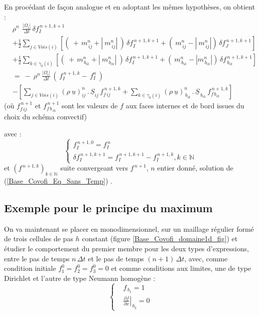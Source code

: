 En proc\'edant de fa\c con analogue et en adoptant les m\^emes hypoth\`eses, on
obtient :
\begin{equation}
\begin{array}{lll}
&\rho^n\,\displaystyle\ \frac{|\Omega_i|}{\Delta
t}\,\delta f_I^{\,n+1,k+1}\\
& +\displaystyle\frac{1}{2}\sum\limits_{j\in Vois(i)}\left[(\
+\,m_{\,ij}^n + |\ m_{\,ij}^n|\ )\,\delta f_I^{\,n+1,k+1}+ (\ m_{\,ij}^n - |\
m_{\,ij}^n|)\,\delta f_J^{\,n+1,k+1}\right]\\
&+\displaystyle\frac{1}{2}\sum\limits_{k\in {\gamma_b(i)}}\left[(\ +\,
m_{\,{b}_{ik}}^n + |\ m_{\,{b}_{ik}}^n|\ )\,\delta f_I^{\,n+1,k+1} + (\
m_{\,{b}_{ik}}^n - |m_{\,{b}_{ik}}^n|)\,\delta
f_{\,{b}_{ik}}^{\,n+1,k+1}\right]\\
& =\ -\ \displaystyle \rho^n \,\frac {|\Omega_i| }{\Delta t}\,(\,f_I^{\,n+1,k}
-\,f_I^n\,)\\
& - \left[\sum\limits_{j\in Vois(i)} (\rho\
\underline{u})^{n}_{ij}\,.\,\underline{S}_{ij}\,
f^{\,n+1,k}_{f\,ij}+\sum\limits_{k\in {\gamma_b(i)}} (\rho\
\underline{u})^{n}_{\,b_{ik}}\,.\,\underline{S}_{\,b_{ik}}\,f^{\,n+1,k}_{f\,{b_{ik}}}\right]
\end{array}
\end{equation}
(o\`{u} $f^{\,n+1}_{f\,ij}$ et $f^{\,n+1}_{f\,{b_{\,ik}}}$ sont les valeurs de $f$
aux faces internes et de bord issues du choix du sch\'{e}ma convectif)

avec :
\begin{equation}
\left\{\begin{array}{ll}
f_I^{\,n+1,0} = f_I^{\,n}\\
\delta f_I^{\,n+1,k+1} = f_I^{\,n+1,k+1} - f_I^{\,n+1,k},{\text {$k\in \mathbb{N}$}}
\end{array}\right.
\end{equation}
et $(f^{\,n+1,k})_{k\in \mathbb{N}}$ suite convergeant vers  $f^{\,n+1}$, $n$
entier donn\'e, solution de (\ref{Base_Covofi_Eq_Sans_Temp}) .\\

\subsection*{Exemple pour le principe du maximum}

On va maintenant se placer en monodimensionnel, sur un maillage r\'egulier
form\'e de trois cellules de pas $h$ constant (figure \ref{Base_Covofi_domaine1d_fig}) et \'etudier le comportement
du premier membre pour les deux types d'expressions, entre le pas de temps
 $n\,\Delta t$ et le pas de temps $(n+1)\,\Delta t$, avec, comme condition
initiale $f_1^0 = f_2^0 =f_3^0 = 0$ et comme conditions aux limites, une de type
Dirichlet et l'autre de type Neumann homog\`ene :
\begin{equation}
\left\{\begin{array}{ll}
&f_{\,b_1} = 1 \\
&\displaystyle \left.\frac{\partial f}{\partial x} \right|_{\,b_2} = 0
\end{array}\right.
\end{equation}


